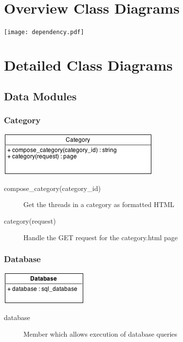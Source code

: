 \documentclass[12pt]{scrartcl}
\begin{document}


\newpage\null\thispagestyle{empty}\newpage

\tableofcontents

\newpage\null\thispagestyle{empty}\newpage

\section{Overview Class Diagrams}
\texttt{[image: dependency.pdf]}

\section{Detailed Class Diagrams}
\subsection{Data Modules}
\subsubsection{Category}
\includegraphics[keepaspectratio]{umls/category_uml.png}
\begin{description}
\item [compose\_category(category\_id)] Get the threads in a category as formatted HTML
\item [category(request)] Handle the GET request for the category.html page
\end{description}

\subsubsection{Database}
\includegraphics[keepaspectratio]{umls/database_uml.png}
\begin{description}
\item [database] Member which allows execution of database queries 
\end{description}
\end{document}
